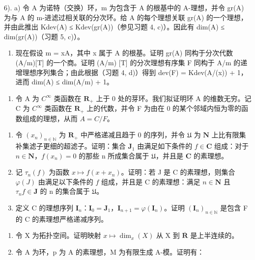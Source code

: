 6). a) 令 A 为诺特（交换）环，m 为包含于 A 的根基中的 A-理想，并令 gr(A) 为与 A 的 m-进滤过相关联的分次环。给 A 的每个理想关联 gr(A) 的一个理想，并由此推出 Kdev(A) ≤ Kdev(gr(A))（参见习题 4, c)）。因此有 dim(A) ≤ dim(gr(A))（习题 5, c)）。

\begin{enumerate}
\def\labelenumi{\alph{enumi})}
\setcounter{enumi}{1}
\tightlist
\item
  现在假设 m = xA，其中 x 属于 A 的根基。证明 gr(A) 同构于分次代数 (A/m)[T] 的一个商。证明 (A/m) {[}T{]} 的分次理想有序集 F 同构于 A/m 的递增理想序列集合；由此根据（习题 4, d)）得到 dev(F) = Kdev(A/(x)) + 1，进而 dim(A) ≤ dim(A/m) + 1。
\end{enumerate}

\begin{enumerate}
\def\labelenumi{\arabic{enumi})}
\setcounter{enumi}{6}
\tightlist
\item
  令 A 为 \(C^\infty\) 类函数在 \(\mathbf{R}_{+}\) 上于 0 处的芽环。我们拟证明环 A 的维数无穷。记 C 为 \(C^\infty\) 类函数在 \(\mathbf{R}_{+}\) 上的代数，并令 F 为由在 0 的某个邻域内恒为零的函数组成的理想，从而 \(A = C / F\)。
\end{enumerate}

\begin{enumerate}
\def\labelenumi{\alph{enumi})}
\item
  令 \((x_{n})_{n\in \mathbb{N}}\) 为 \(\mathbf{R}_{+}\) 中严格递减且趋于 0 的序列，并令 \(\mathfrak{U}\) 为 \(\mathbf{N}\) 上比有限集补集滤子更细的超滤子。证明：集合 \(\mathbf{J}_1\) 由满足如下条件的 \(f\in \mathbf{C}\) 组成：对于 \(n\in \mathbf{N}\)，\(f(x_{n}) = 0\) 的那些 n 所成集合属于 \(\mathfrak{U}\)，并且是 \(\mathbf{C}\) 的素理想。
\item
  记 \(\tau_{n}(f)\) 为函数 \(x\mapsto f(x + x_{n})\)。证明：若 J 是 C 的素理想，则集合 \(\varphi(J)\) 由满足以下条件的 \(f\) 组成，并且是 C 的素理想：满足 \(n\in\mathbf{N}\) 且 \(\tau_{n}f\in\mathbf{J}\) 的 n 的集合属于 \(\mathfrak{U}\)。
\item
  定义 C 的理想序列 \(\mathbf{I}_n\)：\(\mathbf{I}_0 = \mathbf{J}_1\)，\(\mathbf{I}_{n+1} = \varphi(\mathbf{I}_n)\)。证明 \((\mathbf{I}_n)_{n\in\mathbb{N}}\) 是包含 F 的 C 的素理想严格递减序列。
\end{enumerate}

\begin{enumerate}
\def\labelenumi{\arabic{enumi})}
\setcounter{enumi}{7}
\item
  令 X 为拓扑空间。证明映射 \(x \mapsto \dim_x(X)\) 从 X 到 \(\overline{\mathbf{R}}\) 是上半连续的。
\item
  令 A 为环，p 为 A 的素理想，M 为有限生成 A-模。证明有：
\end{enumerate}


